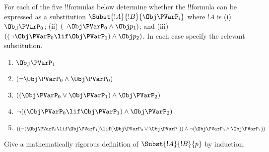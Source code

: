 \documentclass[../../../include/open-logic-section]{subfiles}
\begin{document}
\begin{prob} For each of the five !!{formula}s below determine whether the 
 !!{formula} can be expressed as a substitution \( \Subst{!A}{!B}{\Obj \PVarP_i} \)
 where \( !A \) is (i) \( \Obj \PVarP_0 \); (ii) \( ( \lnot \Obj \PVarP_0 \land \Obj
 p_1) \); and (iii) \( ( ( \lnot \Obj \PVarP_0 \lif \Obj \PVarP_1 ) \land \Obj
 p_2 ) \). In each case specify the relevant substitution.
  \begin{enumerate}
    \item \( \Obj \PVarP_1 \) 
    \item \( ( \lnot \Obj \PVarP_0 \land \Obj \PVarP_0 ) \)
    \item \( ( ( \Obj \PVarP_0 \lor \Obj \PVarP_1 ) \land \Obj \PVarP_2 )  \)
    \item \( \lnot ( ( \Obj \PVarP_0 \lif \Obj \PVarP_1 ) \land \Obj \PVarP_2 ) \)
    \item \( (( \lnot ( \Obj \PVarP_0 \lif \Obj \PVarP_1 ) \lif ( \Obj \PVarP_0 \lor \Obj \PVarP_1 )) \land \lnot ( \Obj \PVarP_0 \land \Obj \PVarP_1 )) \)
  \end{enumerate}
\end{prob}

\begin{prob}
Give a mathematically rigorous definition of $\Subst{!A}{!B}{p}$ by
induction.
\end{prob}
\end{document}
